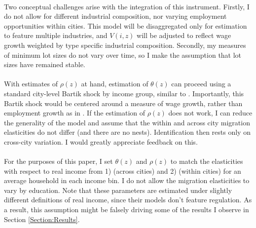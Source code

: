 \documentclass[]{article}
\begin{document}
\paragraph*{}
Two conceptual challenges arise with the integration of this instrument. Firstly, I do not allow for different industrial composition, nor varying employment opportunities within cities. This model will be disaggregated only for estimation to feature multiple industries, and $V(i, z)$ will be adjusted to reflect wage growth weighted by type specific industrial composition. Secondly, my measures of minimum lot sizes do not vary over time, so I make the assumption that lot sizes have remained stable.  
\paragraph*{}
With estimates of $\rho(z)$ at hand, estimation of $\theta(z)$ can proceed using a standard city-level Bartik shock by income group, similar to \cite{diamond2016}. Importantly, this Bartik shock would be centered around a measure of wage growth, rather than employment growth as in \cite{BSH}. If the estimation of $\rho(z)$ does not work, I can reduce the generality of the model and assume that the within and across city migration elasticities do not differ (and there are no nests). Identification then rests only on cross-city variation. I would greatly appreciate feedback on this.  

\paragraph*{}
For the purposes of this paper, I set $\theta(z)$ and $\rho(z)$ to match the elasticities with respect to real income from 1) \cite{morettihornbeck} (across cities) and 2) \cite{herzog2022} (within cities) for an average household in each income bin. I do not allow the migration elasticities to vary by education. Note that these parameters are estimated under slightly different definitions of real income, since their models don't feature regulation. As a result, this assumption might be falsely driving some of the results I observe in Section \ref{Section:Results}. 
 
\end{document}
